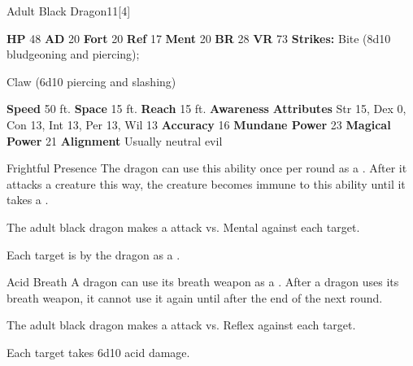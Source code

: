   \begin{monsubsection}{Adult Black Dragon}{11}[4]
    \vspace{-1em}\vspace{-1em}
    \vspace{0em}

    
    

    \begin{spellcontent}
      \begin{spelltargetinginfo}
        \pari \textbf{HP} 48 \monsep
          \textbf{AD} 20 \monsep
          \textbf{Fort} 20 \monsep
          \textbf{Ref} 17 \monsep
          \textbf{Ment} 20
        \pari \textbf{BR} 28 \monsep
        \textbf{VR} 73
        \pari \textbf{Strikes:}
            Bite  (8d10 bludgeoning and piercing);
\par Claw  (6d10 piercing and slashing)
      \end{spelltargetinginfo}
    \end{spellcontent}
    \begin{monsterfooter}
      \pari \textbf{Speed} 50 ft. \monsep
        \textbf{Space} 15 ft. \monsep
        \textbf{Reach} 15 ft.
      \pari \textbf{Awareness} 
      \pari \textbf{Attributes}
        Str 15, Dex 0,
        Con 13, Int 13,
        Per 13, Wil 13
      \pari \textbf{Accuracy} 16 \monsep
        \textbf{Mundane Power} 23 \monsep
      \textbf{Magical Power} 21
      \pari \textbf{Alignment} Usually neutral evil
    \end{monsterfooter}
  \end{monsubsection}
  \begin{freeability}{Frightful Presence}
      The dragon can use this ability once per round as a .
      After it attacks a creature this way, the creature becomes immune to this ability until it takes a .
      \par The adult black dragon makes a  attack
        vs. Mental against each target.
    
    \hit Each target is  by the dragon as a .
    \end{freeability}
  

    \begin{freeability}{Acid Breath}
      A dragon can use its breath weapon as a .
      After a dragon uses its breath weapon, it cannot use it again until after the end of the next round.
      \par The adult black dragon makes a  attack
        vs. Reflex against each target.
    
    \hit Each target takes 6d10 acid damage.
    \end{freeability}
  
